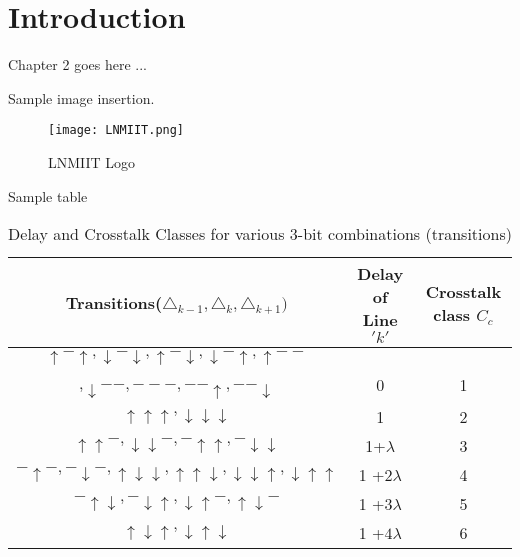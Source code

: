 \section{Introduction}
Chapter 2 goes here ...

Sample image insertion. 

\begin{figure}[h]
\centering
\texttt{[image: LNMIIT.png]}
\caption{LNMIIT Logo }
\label{figure:1}
\end{figure}


Sample table
\begin{table}[t]
\centering
\begin{tabular}{|c|c|c|}
\hline
Transitions($\triangle_{k-1}, \triangle_k, \triangle_{k+1})$ & Delay of Line $'k'$ & Crosstalk class $C_c$\\
\hline

$\uparrow-\uparrow , \downarrow-\downarrow, \uparrow-\downarrow, \downarrow-\uparrow, \uparrow- -$ & & \\

,$ \downarrow - -, - - -, - - \uparrow, - - \downarrow$  & 0 & 1\\
\hline

$\uparrow\uparrow\uparrow, \downarrow\downarrow\downarrow $& 1 & 2\\
\hline

$\uparrow\uparrow -, \downarrow\downarrow-, -\uparrow\uparrow, -\downarrow\downarrow$ & 1+$\lambda$ &3\\
\hline

$-\uparrow-, -\downarrow-, \uparrow\downarrow\downarrow, \uparrow\uparrow\downarrow, \downarrow\downarrow\uparrow, \downarrow\uparrow\uparrow$ & 1 +$2\lambda$ & 4\\
\hline

$-\uparrow\downarrow, -\downarrow\uparrow, \downarrow\uparrow-, \uparrow\downarrow-$ & 1 +$3\lambda$ & 5\\
\hline

$\uparrow\downarrow\uparrow, \downarrow\uparrow\downarrow $ & 1 +$4\lambda$ & 6\\
\hline

\end{tabular}
\caption{Delay and Crosstalk Classes for various 3-bit combinations (transitions)}
\label{tab:}
\end{table}
